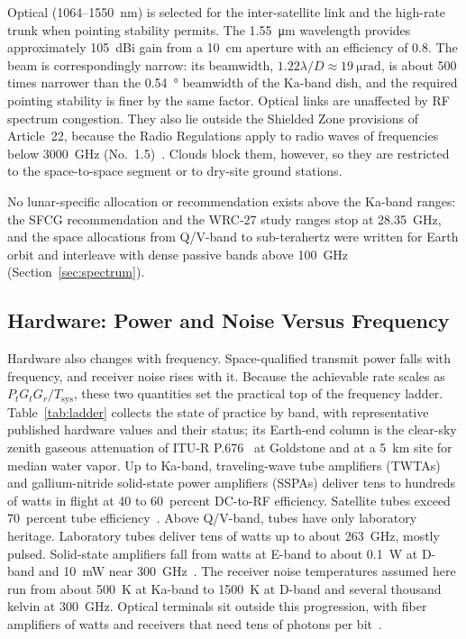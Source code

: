 \documentclass{IEEEoj}
\begin{document}
Optical (\SI{1064}{}--\SI{1550}{nm}) is selected for the inter-satellite link and the high-rate trunk when pointing stability permits. The \SI{1.55}{\micro\m} wavelength provides approximately \SI{105}{dBi} gain from a \SI{10}{cm} aperture with an efficiency of 0.8. The beam is correspondingly narrow: its beamwidth, $1.22\lambda/D \approx \SI{19}{\micro\radian}$, is about 500 times narrower than the \SI{0.54}{\degree} beamwidth of the Ka-band dish, and the required pointing stability is finer by the same factor. Optical links are unaffected by RF spectrum congestion. They also lie outside the Shielded Zone provisions of Article~22, because the Radio Regulations apply to radio waves of frequencies below \SI{3000}{GHz} (No.~1.5)~\cite{itu_rr2024}. Clouds block them, however, so they are restricted to the space-to-space segment or to dry-site ground stations.


No lunar-specific allocation or recommendation exists above the Ka-band ranges: the SFCG recommendation and the WRC-27 study ranges stop at \SI{28.35}{GHz}, and the space allocations from Q/V-band to sub-terahertz were written for Earth orbit and interleave with dense passive bands above \SI{100}{GHz} (Section~\ref{sec:spectrum}).

\subsection{Hardware: Power and Noise Versus Frequency}
Hardware also changes with frequency. Space-qualified transmit power falls with frequency, and receiver noise rises with it. Because the achievable rate scales as $P_t G_t G_r / T_{\mathrm{sys}}$, these two quantities set the practical top of the frequency ladder. Table~\ref{tab:ladder} collects the state of practice by band, with representative published hardware values and their status; its Earth-end column is the clear-sky zenith gaseous attenuation of ITU-R P.676~\cite{itur_p676_13} at Goldstone and at a \SI{5}{km} site for median water vapor. Up to Ka-band, traveling-wave tube amplifiers (TWTAs) and gallium-nitride solid-state power amplifiers (SSPAs) deliver tens to hundreds of watts in flight at 40 to 60~percent DC-to-RF efficiency. Satellite tubes exceed 70~percent tube efficiency~\cite{menninger2005,lohmeyer2016}. Above Q/V-band, tubes have only laboratory heritage. Laboratory tubes deliver tens of watts up to about \SI{263}{GHz}, mostly pulsed. Solid-state amplifiers fall from watts at E-band to about 0.1~W at D-band and 10~mW near \SI{300}{GHz}~\cite{paoloni2026,maiwald2023}. The receiver noise temperatures assumed here run from about \SI{500}{K} at Ka-band to \SI{1500}{K} at D-band and several thousand kelvin at \SI{300}{GHz}. Optical terminals sit outside this progression, with fiber amplifiers of watts and receivers that need tens of photons per bit~\cite{caplan_laser_comm}.
\end{document}
